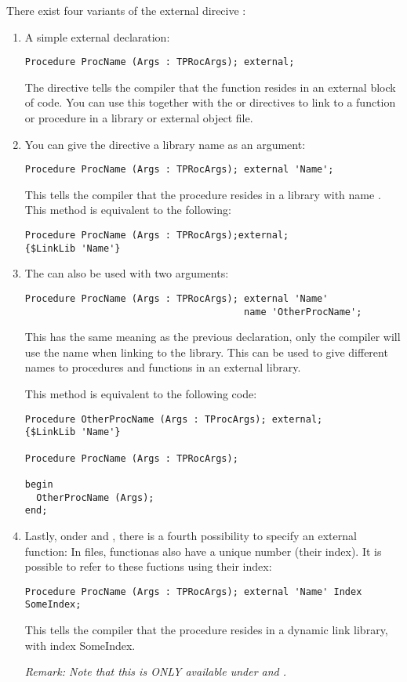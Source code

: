 \documentclass{report}
\begin{document}
There exist four variants of the external direcive :
\begin{enumerate}
\item A simple external declaration:
\begin{verbatim}
Procedure ProcName (Args : TPRocArgs); external;
\end{verbatim}
The  directive tells the compiler that the function resides in
an external block of code. You can use this together with the 
or  directives to link to a function or procedure in a
library or external object file.

\item You can give the  directive a library name as an
argument:
\begin{verbatim}
Procedure ProcName (Args : TPRocArgs); external 'Name';
\end{verbatim}
This tells the compiler that the procedure resides in a library with name
. This method is equivalent to the following:
\begin{verbatim}
Procedure ProcName (Args : TPRocArgs);external;
{$LinkLib 'Name'}
\end{verbatim}
\item The  can also be used with two arguments:
\begin{verbatim}
Procedure ProcName (Args : TPRocArgs); external 'Name' 
                                       name 'OtherProcName';
\end{verbatim}
This has the same meaning as the previous declaration, only the compiler
will use the name  when linking to the library. This
can be used to give different names to procedures and functions in an
external library.

This method is equivalent to the following code:
\begin{verbatim}
Procedure OtherProcName (Args : TProcArgs); external;
{$LinkLib 'Name'}

Procedure ProcName (Args : TPRocArgs);

begin
  OtherProcName (Args);
end;
\end{verbatim}
\item Lastly, onder \windows and \ostwo, there is a fourth possibility
to specify an external function: In  files, functionas also have
a unique number (their index). It is possible to refer to these fuctions
using their index:
\begin{verbatim}
Procedure ProcName (Args : TPRocArgs); external 'Name' Index SomeIndex;
\end{verbatim} 
This tells the compiler that the procedure  resides in a
dynamic link library, with index {SomeIndex}.

\em{Remark:} Note that this is ONLY available under \windows and \ostwo.
\end{enumerate}
\end{document}
